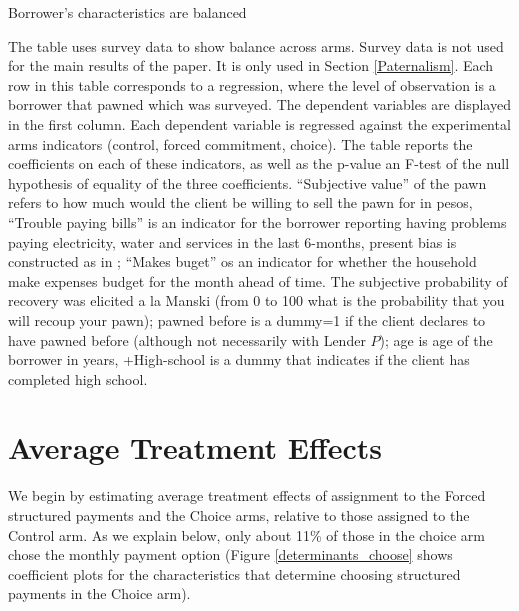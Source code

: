 \documentclass[12pt, a4paper]{article}
\begin{document}
\begin{table}[H]
\caption{Borrower's characteristics are balanced}
\label{SS_final}
\begin{center}
\resizebox{0.65\textwidth}{!}{
\footnotesize{}
}
\end{center}
\scriptsize {The table uses survey data to show balance across arms. Survey data is not used for the main results of the paper. It is only used in Section \ref{Paternalism}. Each row in this table corresponds to a regression, where the level of observation is a borrower that pawned which was surveyed.  The dependent variables are displayed in the first column. Each dependent variable is regressed against the experimental arms indicators (control, forced commitment, choice). The table reports the coefficients on each of these indicators, as well as the p-value an F-test of the null hypothesis of equality of the three coefficients. ``Subjective value'' of the pawn refers to how much would the client be willing to sell the pawn for in pesos, ``Trouble paying bills'' is an indicator for the borrower reporting having problems paying electricity, water and services in the last 6-months, present bias is constructed as in \cite{Ashraf}; ``Makes buget'' os an indicator for whether the household make expenses budget for the month ahead of time. The subjective probability of recovery was elicited a la Manski (from 0 to 100 what is the probability that you will recoup your pawn); pawned before is a dummy=1 if the client declares to have pawned before (although not necessarily with Lender $P$); age is age of the borrower in years, +High-school is a dummy that indicates if the client has completed high school. 
}
\end{table}




\section{Average Treatment Effects} \label{Experiment}



We begin by estimating average treatment effects of assignment to the Forced structured payments and the Choice arms, relative to those assigned to the Control arm. As we explain below, only about 11\% of those in the choice arm chose the monthly payment option (Figure \ref{determinants_choose} shows coefficient plots for the characteristics that determine choosing structured payments in the Choice arm).
\end{document}
